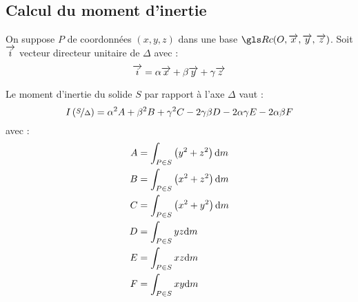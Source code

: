 	\subsection{Calcul du moment d'inertie}
On suppose $P$ de coordonnées $(x,y,z)$ dans une base $\Rc(O,\vect{x},\vect{y},\vect{z})$. Soit $\overrightarrow{i}$ vecteur directeur unitaire de $\Delta$ avec :
	\begin{equation}
		\overrightarrow{i}=\alpha\overrightarrow{x}+\beta\overrightarrow{y}+\gamma\overrightarrow{z}
	\end{equation}
	\begin{theorem}
		Le moment d'inertie du solide $S$ par rapport à l'axe $\Delta$ vaut :
		\begin{equation}
			I\left(\nicefrac{S}{\Delta}\right)=\alpha^2A+\beta^2B+\gamma^2C-2\gamma\beta D-2\alpha\gamma E-2\alpha\beta F
		\end{equation}
		avec :
		\begin{subequations}
			\begin{align}
				A&=\int_{P\in S}\left(y^2+z^2\right)\mathrm{d}m	\label{eq:moment-inertie-A}\\
				B&=\int_{P\in S}\left(x^2+z^2\right)\mathrm{d}m\\
				C&=\int_{P\in S}\left(x^2+y^2\right)\mathrm{d}m\\
				D&=\int_{P\in S}yz\mathrm{d}m\\
				E&=\int_{P\in S}xz\mathrm{d}m\\
				F&=\int_{P\in S}xy\mathrm{d}m
			\end{align}
			\label{eq:composantes-inertie}
		\end{subequations}
	\end{theorem}

